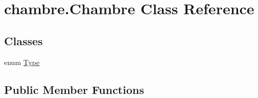 \hypertarget{classchambre_1_1_chambre}{}\section{chambre.\+Chambre Class Reference}
\label{classchambre_1_1_chambre}
\subsection*{Classes}
\begin{DoxyCompactItemize}
\item 
enum \hyperlink{enumchambre_1_1_chambre_1_1_type}{Type}
\end{DoxyCompactItemize}
\subsection*{Public Member Functions}
